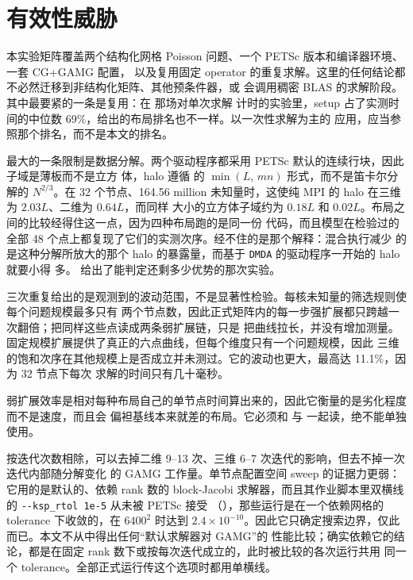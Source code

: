 \documentclass[11pt,a4paper,oneside]{report}
\begin{document}
\section{有效性威胁}
\label{sec:threats}
本实验矩阵覆盖两个结构化网格 Poisson 问题、一个 PETSc 版本和编译器环境、一套 CG+GAMG 配置，
以及复用固定 operator 的重复求解。这里的任何结论都不必然迁移到非结构化矩阵、其他预条件器，或
会调用稠密 BLAS 的求解阶段。其中最要紧的一条是复用：在  那场对单次求解
计时的实验里，setup 占了实测时间的中位数 69\%，给出的布局排名也不一样。以一次性求解为主的
应用，应当参照那个排名，而不是本文的排名。

最大的一条限制是数据分解。两个驱动程序都采用 PETSc 默认的连续行块，因此子域是薄板而不是立方
体，halo 遵循  的 $\min(L,\,mn)$ 形式，而不是笛卡尔分解的 $N^{2/3}$。在
32 个节点、164.56 million 未知量时，这使纯 MPI 的 halo 在三维为 $2.03L$、二维为 $0.64L$，而同样
大小的立方体子域约为 $0.18L$ 和 $0.02L$。布局之间的比较经得住这一点，因为四种布局跑的是同一份
代码，而且模型在检验过的全部 48 个点上都复现了它们的实测次序。经不住的是那个解释：混合执行减少
的是这种分解所放大的那个 halo 的暴露量，而基于 \texttt{DMDA} 的驱动程序一开始的 halo 就要小得
多。 给出了能判定还剩多少优势的那次实验。

三次重复给出的是观测到的波动范围，不是显著性检验。每核未知量的筛选规则使每个问题规模最多只有
两个节点数，因此正式矩阵内的每一步强扩展都只跨越一次翻倍；把同样这些点读成两条弱扩展链，只是
把曲线拉长，并没有增加测量。固定规模扩展提供了真正的六点曲线，但每个维度只有一个问题规模，因此
三维的饱和次序在其他规模上是否成立并未测过。它的波动也更大，最高达 11.1\%，因为 32 节点下每次
求解的时间只有几十毫秒。

弱扩展效率是相对每种布局自己的单节点时间算出来的，因此它衡量的是劣化程度而不是速度，而且会
偏袒基线本来就差的布局。它必须和  与  一起读，绝不能单独
使用。

按迭代次数相除，可以去掉二维 9--13 次、三维 6--7 次迭代的影响，但去不掉一次迭代内部随分解变化
的 GAMG 工作量。单节点配置空间 sweep 的证据力更弱：它用的是默认的、依赖 rank 数的 block-Jacobi
求解器，而且其作业脚本里双横线的 \texttt{-{}-ksp\_rtol 1e-5} 从未被 PETSc 接受
（），那些运行是在一个依赖网格的 tolerance 下收敛的，在 $6400^2$ 时达到
$2.4\times10^{-10}$。因此它只确定搜索边界，仅此而已。本文不从中得出任何“默认求解器对 GAMG”的
性能比较；确实依赖它的结论，都是在固定 rank 数下或按每次迭代成立的，此时被比较的各次运行共用
同一个 tolerance。全部正式运行传这个选项时都用单横线。
\end{document}
